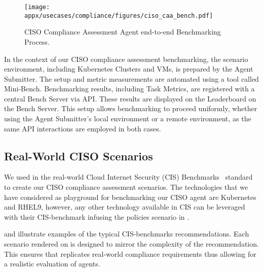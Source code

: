 \begin{figure*}[t!]
    \centering
    \texttt{[image: appx/usecases/compliance/figures/ciso\_caa\_bench.pdf]}
    \caption{CISO Compliance Assessment Agent end-to-end Benchmarking Process.}
    \label{fig:CISO_CAA_ench}
\end{figure*}

In the context of our CISO compliance assessment benchmarking, the scenario environment, including Kubernetes Clusters and VMs, is prepared by the Agent Submitter. The setup and metric measurements are automated using a tool called Mini-Bench. Benchmarking results, including Task Metrics, are registered with a central Bench Server via API. These results are displayed on the Leaderboard on the Bench Server. This setup allows benchmarking to proceed uniformly, whether using the Agent Submitter's local environment or a remote environment, as the same API interactions are employed in both cases.

\subsection{\bench Real-World CISO Scenarios}
We used in \bench the real-world Cloud Internet Security (CIS) Benchmarks~\cite{cis-b} standard to create our CISO compliance assessment scenarios. The technologies that we have considered as playground for benchmarking our CISO agent are Kubernetes and RHEL9, however, any other technology available in CIS can be leveraged with their CIS-benchmark infusing the policies scenario in \bench.

 and  illustrate examples of the typical CIS-benchmarks recommendations. Each scenario rendered on \bench is designed to mirror the complexity of the recommendation. This ensures that \bench replicates real-world compliance requirements thus allowing for a realistic evaluation of agents.  


